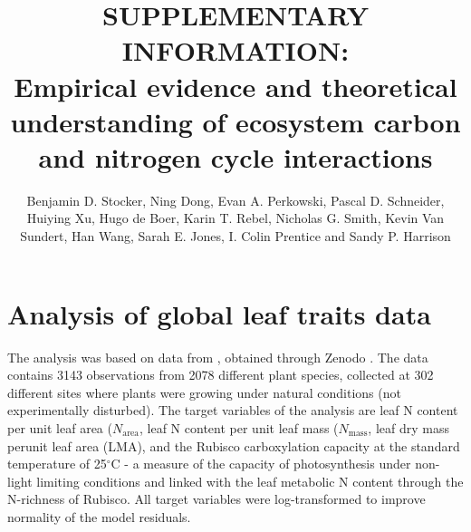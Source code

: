 \documentclass{myreport}
\begin{document}
\pagestyle{headings}

\renewcommand{\thefigure}{\arabic{figure}}
\renewcommand{\thetable}{\arabic{table}}
\renewcommand{\thesection}{Notes S\arabic{section}}
\renewcommand{\theequation}{\arabic{equation}}

\setcounter{section}{2}

% 

\title{SUPPLEMENTARY INFORMATION:\\
Empirical evidence and theoretical understanding of ecosystem carbon and nitrogen cycle interactions}
\author{Benjamin D. Stocker, Ning Dong, Evan A. Perkowski, Pascal D. Schneider,
Huiying Xu, Hugo de Boer, Karin T. Rebel, Nicholas G. Smith, Kevin Van Sundert, Han Wang, Sarah E. Jones, I. Colin Prentice and Sandy P. Harrison} 



\section{Analysis of global leaf traits data}

The analysis was based on data from \citet{dong22jecol}, obtained through Zenodo \citep{dong22zenodo}. The data contains 3143 observations from 2078 different plant species, collected at 302 different sites where plants were growing under natural conditions (not experimentally disturbed). The target variables of the analysis are leaf N content per unit leaf area ($N_\text{area}$, leaf N content per unit leaf mass ($N_\text{mass}$, leaf dry mass perunit leaf area (LMA), and the Rubisco carboxylation capacity at the standard temperature of 25$^\circ$C - a measure of the capacity of photosynthesis under non-light limiting conditions and linked with the leaf metabolic N content through the N-richness of Rubisco. All target variables were log-transformed to improve normality of the model residuals. 
\end{document}
